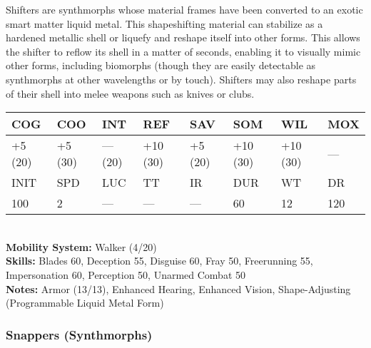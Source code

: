 Shifters are synthmorphs whose material frames have been converted to an exotic smart matter liquid metal. This shapeshifting material can stabilize as a hardened metallic shell or liquefy and reshape itself into other forms. This allows the shifter to reflow its shell in a matter of seconds, enabling it to visually mimic other forms, including biomorphs (though they are easily detectable as synthmorphs at other wavelengths or by touch). Shifters may also reshape parts of their shell into melee weapons such as knives or clubs. \\ \begin{tabular}{|l|l|l|l|l|l|l|l|} \hline

COG &COO &INT &REF &SAV &SOM &WIL &MOX \\ \hline

+5 (20) &+5 (30) &— (20) &+10 (30) &+5 (20) &+10 (30) &+10 (30) &— \\ \hline

INIT &SPD &LUC &TT &IR &DUR &WT &DR \\ \hline

100 &2 &— &— &— &60 &12 &120 \\ \hline

\end{tabular} \\ \textbf{Mobility System: }Walker (4/20) \\ \textbf{Skills:} Blades 60, Deception 55, Disguise 60, Fray 50, Freerunning 55, Impersonation 60, Perception 50, Unarmed Combat 50 \\ \textbf{Notes: }Armor (13/13), Enhanced Hearing, Enhanced Vision, Shape-Adjusting (Programmable Liquid Metal Form) 

\subsubsection{Snappers (Synthmorphs)} 

